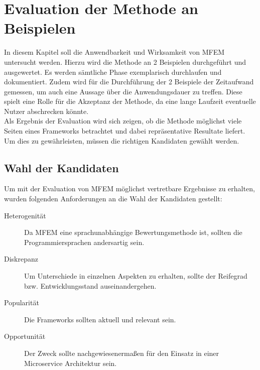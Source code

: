 \section{Evaluation der Methode an Beispielen}

In diesem Kapitel soll die Anwendbarkeit und Wirksamkeit von \ac{MFEM} untersucht werden. Hierzu wird die Methode an 2 Beispielen durchgeführt und ausgewertet. Es werden sämtliche Phase exemplarisch durchlaufen und dokumentiert. Zudem wird für die Durchführung der 2 Beispiele der Zeitaufwand gemessen, um auch eine Aussage über die Anwendungsdauer zu treffen. Diese spielt eine Rolle für die Akzeptanz der Methode, da eine lange Laufzeit eventuelle Nutzer abschrecken könnte.\\ 
Als Ergebnis der Evaluation wird sich zeigen, ob die Methode möglichst viele Seiten eines Frameworks betrachtet und dabei repräsentative Resultate liefert.  
Um dies zu gewährleisten, müssen die richtigen Kandidaten gewählt werden.

\subsection{Wahl der Kandidaten}

Um mit der Evaluation von \ac{MFEM} möglichst vertretbare Ergebnisse zu erhalten, wurden folgenden Anforderungen an die Wahl der Kandidaten gestellt:

\begin{description}
	\item[Heterogenität] Da \ac{MFEM} eine sprachunabhängige Bewertungsmethode ist, sollten die Programmiersprachen andersartig sein.
	\item[Diskrepanz] Um Unterschiede in einzelnen Aspekten zu erhalten, sollte der Reifegrad bzw. Entwicklungsstand auseinandergehen.
	\item[Popularität] Die Frameworks sollten aktuell und relevant sein.
	\item[Opportunität] Der Zweck sollte nachgewiesenermaßen für den Einsatz in einer Microservice Architektur sein.
\end{description}

